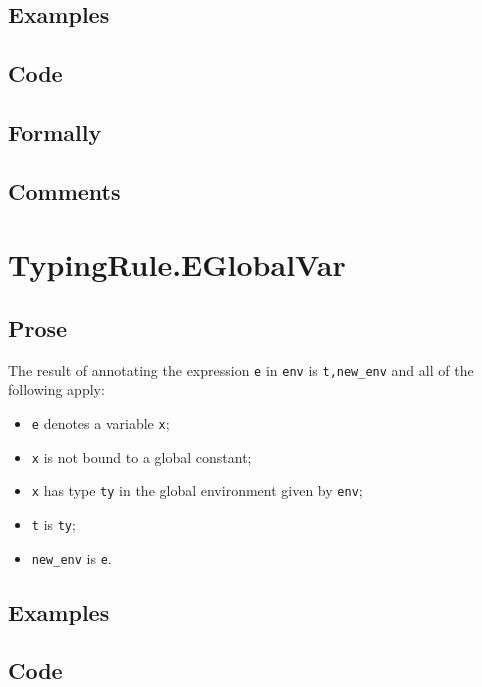 \documentclass{book}
\begin{document}
  \subsection{Examples}

  \subsection{Code}

  \subsection{Formally}

  \subsection{Comments}

\section{TypingRule.EGlobalVar \label{sec:TypingRule.EGlobalVar}}

  \subsection{Prose}
  The result of annotating the expression \texttt{e} in \texttt{env} is
\texttt{t,new\_env} and all of the following apply:
  \begin{itemize}
  \item \texttt{e} denotes a variable \texttt{x};
  \item \texttt{x} is not bound to a global constant;
  \item \texttt{x} has type \texttt{ty} in the global environment given by \texttt{env};
  \item \texttt{t} is \texttt{ty};
  \item \texttt{new\_env} is \texttt{e}.
  \end{itemize}

  \subsection{Examples}

  \subsection{Code}
\end{document}
